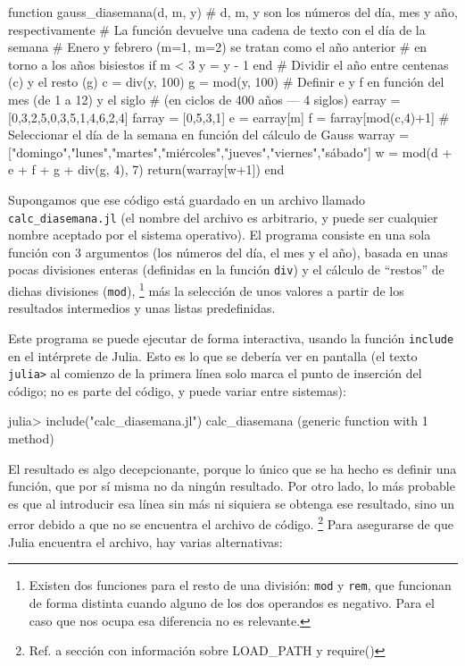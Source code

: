 ﻿\documentclass{article}
\newcommand{\jl}{\texttt}
\begin{document}
\begin{juliacode}
function gauss_diasemana(d, m, y)
# d, m, y son los números del día, mes y año, respectivamente
# La función devuelve una cadena de texto con el día de la semana
  # Enero y febrero (m=1, m=2) se tratan como el año anterior
  # en torno a los años bisiestos
  if m < 3
    y = y - 1
  end
  # Dividir el año entre centenas (c) y el resto (g)
  c = div(y, 100)
  g = mod(y, 100)
  # Definir e y f en función del mes (de 1 a 12) y el siglo
  # (en ciclos de 400 años --- 4 siglos)
  earray = [0,3,2,5,0,3,5,1,4,6,2,4]
  farray = [0,5,3,1]
  e = earray[m]
  f = farray[mod(c,4)+1]
  # Seleccionar el día de la semana en función del cálculo de Gauss
  warray = ["domingo","lunes","martes","miércoles","jueves","viernes","sábado"]
  w = mod(d + e + f + g + div(g, 4), 7)
  return(warray[w+1])
end
\end{juliacode}

Supongamos que ese código está guardado en un archivo llamado \texttt{calc_diasemana.jl} (el nombre del archivo es arbitrario, y puede ser cualquier nombre aceptado por el sistema operativo). El programa consiste en una sola función con 3 argumentos (los números del día, el mes y el año), basada en unas pocas divisiones enteras (definidas en la función \jl{div}) y el cálculo de ``restos'' de dichas divisiones (\jl{mod}),%
\footnote{%
Existen dos funciones para el resto de una división: \jl{mod} y \jl{rem}, que funcionan de forma distinta cuando alguno de los dos operandos es negativo. Para el caso que nos ocupa esa diferencia no es relevante.%
}
más la selección de unos valores a partir de los resultados intermedios y unas listas predefinidas.

Este programa se puede ejecutar de forma interactiva, usando la función \jl{include} en el intérprete de Julia. Esto es lo que se debería ver en pantalla (el texto \jl{julia>} al comienzo de la primera línea solo marca el punto de inserción del código; no es parte del código, y puede variar entre sistemas):

julia> include("calc_diasemana.jl")
calc_diasemana (generic function with 1 method)

El resultado es algo decepcionante, porque lo único que se ha hecho es definir una función, que por sí misma no da ningún resultado. Por otro lado, lo más probable es que al introducir esa línea sin más ni siquiera se obtenga ese resultado, sino un error debido a que no se encuentra el archivo de código.%
\footnote{%
Ref. a sección con información sobre LOAD\_PATH y require()%
}
Para asegurarse de que Julia encuentra el archivo,
hay varias alternativas:
\end{document}
